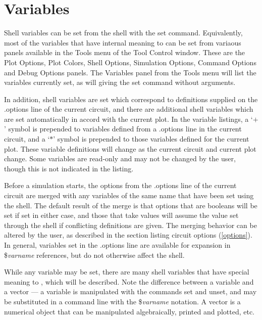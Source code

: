 
\section{Variables}
\label{variables}


Shell variables can be set from the shell with the {\cb set} command. 
Equivalently, most of the variables that have internal meaning to
{\WRspice} can be set from variaous panels available in the {\cb
Tools} menu of the {\cb Tool Control} window.  These are the {\cb Plot
Options}, {\cb Plot Colors}, {\cb Shell Options}, {\cb Simulation
Options}, {\cb Command Options} and {\cb Debug Options} panels.  The
{\cb Variables} panel from the {\cb Tools} menu will list the
variables currently set, as will giving the {\cb set} command without
arguments.

In addition, shell variables are set which correspond to definitions
supplied on the {\vt .options} line of the current circuit, and there
are additional shell variables which are set automatically in accord
with the current plot.  In the variable listings, a `{\vt $+$}' symbol
is prepended to variables defined from a {\vt .options} line in the
current circuit, and a `{\vt $*$}' symbol is prepended to those
variables defined for the current plot.  These variable definitions
will change as the current circuit and current plot change.  Some
variables are read-only and may not be changed by the user, though
this is not indicated in the listing.

Before a simulation starts, the options from the {\vt .options} line
of the current circuit are merged with any variables of the same name
that have been set using the shell.  The default result of the merge
is that options that are booleans will be set if set in either case,
and those that take values will assume the value set through the shell
if conflicting definitions are given.  The merging behavior can be
altered by the user, as described in the section listing circuit
options (\ref{options}).  In general, variables set in the {\vt
.options} line are available for expansion in \${\it varname}
references, but do not otherwise affect the shell.

While any variable may be set, there are many shell variables that
have special meaning to {\WRspice}, which will be described.  Note the
difference between a variable and a vector --- a variable is
manipulated with the commands {\cb set} and {\cb unset}, and may be
substituted in a command line with the \${\it varname} notation.  A
vector is a numerical object that can be manipulated algebraically,
printed and plotted, etc.


